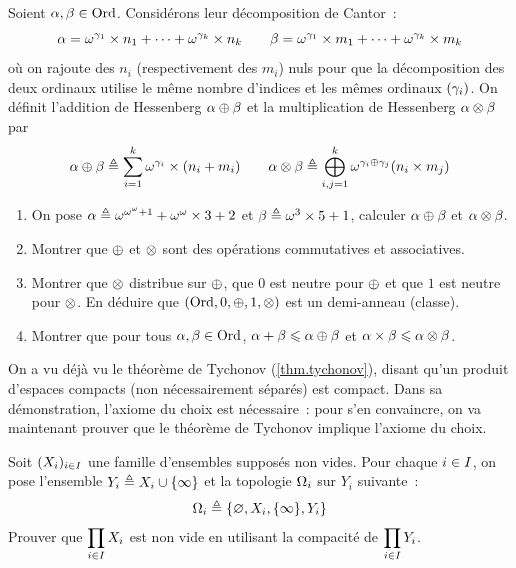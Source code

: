 \begin{exercise}
  Soient $\alpha,\beta \in \operatorname{Ord}$. Considérons leur décomposition de Cantor~:
  \[\alpha = \omega^{\gamma_1}\times n_1 + \cdots + \omega^{\gamma_k} \times n_k\qquad
  \beta = \omega^{\gamma_1}\times m_1 + \cdots + \omega^{\gamma_k} \times m_k\]
  où on rajoute des $n_i$ (respectivement des $m_i$) nuls pour que la
  décomposition des deux ordinaux utilise le même nombre d'indices et les
  mêmes ordinaux $(\gamma_i)$.
  On définit l'addition de Hessenberg $\alpha\mathbin{\oplus}\beta$ et la multiplication
  de Hessenberg $\alpha\mathbin{\otimes}\beta$ par
  \[\alpha\mathbin{\oplus}\beta \triangleq \sum_{i = 1}^{k} \omega^{\gamma_i}\times(n_i+m_i)\qquad
  \alpha\mathbin{\otimes}\beta \triangleq \mathop{\bigoplus}_{i,j = 1}^k
  \omega^{\gamma_i \mathbin{\oplus}\gamma_{j}} (n_i \times m_{j})\]
  \begin{enumerate}[label=(\roman*)]
  \item On pose $\alpha \triangleq \omega^{\omega^\omega + 1} + \omega^{\omega} \times 3 + 2$ et
    $\beta \triangleq \omega^3 \times 5 + 1$, calculer $\alpha\mathbin{\oplus}\beta$ et
    $\alpha\mathbin{\otimes}\beta$.
  \item Montrer que $\mathbin{\oplus}$ et $\mathbin{\otimes}$ sont des opérations commutatives et
    associatives.
  \item Montrer que $\mathbin{\otimes}$ distribue sur $\mathbin{\oplus}$, que $0$ est neutre pour
    $\mathbin{\oplus}$ et que $1$ est neutre pour $\mathbin{\otimes}$. En déduire que
    $(\operatorname{Ord},0,\mathbin{\oplus},1,\mathbin{\otimes})$ est un demi-anneau (classe).
  \item Montrer que pour tous $\alpha,\beta \in \operatorname{Ord}$,
    $\alpha + \beta \leqslant \alpha \mathbin{\oplus} \beta$ et
    $\alpha\times\beta\leqslant\alpha\mathbin{\otimes}\beta$.
  \end{enumerate}
\end{exercise}

\begin{exercise}
  On a vu déjà vu le théorème de Tychonov (\cref{thm.tychonov}), disant qu'un
  produit d'espaces compacts (non nécessairement séparés) est compact. Dans sa
  démonstration, l'axiome du choix est nécessaire~: pour s'en convaincre, on va
  maintenant prouver que le théorème de Tychonov implique l'axiome du choix.

  Soit $(X_i)_{i \in I}$ une famille d'ensembles supposés non vides. Pour
  chaque $i\in I$, on pose l'ensemble $Y_i \triangleq X_i\cup\{\infty\}$ et la
  topologie $\Omega_{i}$ sur $Y_i$ suivante~:
  \[\Omega_{i} \triangleq \{\varnothing,X_i,\{\infty\}, Y_i\}\]
  Prouver que $\displaystyle\prod_{i \in I} X_i$ est non vide en utilisant
  la compacité de $\displaystyle\prod_{i \in I} Y_i$.
\end{exercise}

